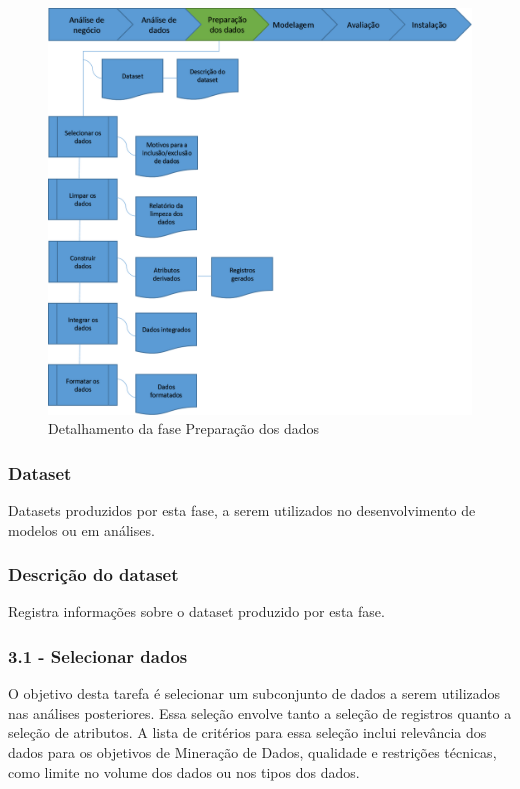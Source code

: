 
\begin{figure}[H]
	\includegraphics[scale=0.8]{img/CRISP-DM-Preparacao-dos-dados.png}
	\caption{Detalhamento da fase Preparação dos dados}
	\label{img:CRISP-DM-Preparacao-dos-dados}
\end{figure}


\subsubsection*{Dataset}

Datasets produzidos por esta fase, a serem utilizados no desenvolvimento de modelos ou em análises.

\subsubsection*{Descrição do dataset}

Registra informações sobre o dataset produzido por esta fase.

\subsubsection*{\textbf{3.1 - Selecionar dados}}

O objetivo desta tarefa é selecionar um subconjunto de dados a serem utilizados nas análises posteriores. Essa seleção envolve tanto a seleção de registros quanto a seleção de atributos. A lista de critérios para essa seleção inclui relevância dos dados para os objetivos de Mineração de Dados, qualidade e restrições técnicas, como limite no volume dos dados ou nos tipos dos dados.

